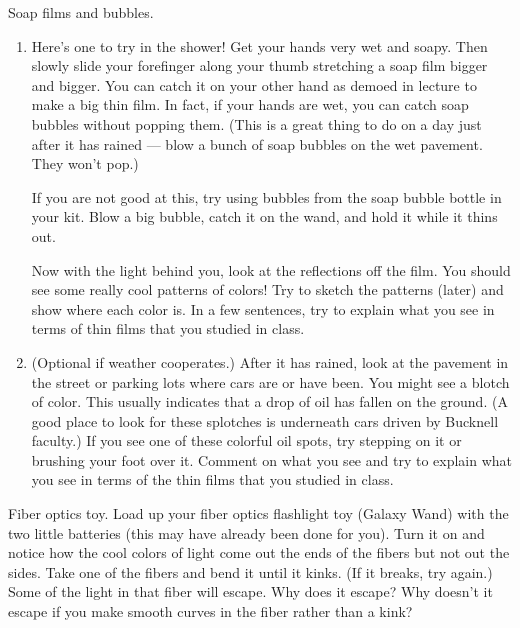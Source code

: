 \newpage

\begin{aproblem}{Soap films and bubbles.} 
  \begin{enumerate} 
  \item Here's one to try in the shower! Get your hands very wet and
    soapy. Then slowly slide your forefinger along your thumb
    stretching a soap film bigger and bigger.  You can catch it on
    your other hand as demoed in lecture to make a big thin film.  In
    fact, if your hands are wet, you can catch soap bubbles without
    popping them. (This is a great thing to do on a day just after it
    has rained --- blow a bunch of soap bubbles on the wet pavement.
    They won't pop.)

    If you are not good at this, try using bubbles from the soap
    bubble bottle in your kit.  Blow a big bubble, catch it on the
    wand, and hold it while it thins out.

    Now with the light behind you, look at the reflections off the
    film. You should see some really cool patterns of colors!  Try to
    sketch the patterns (later) and show where each color is.  In a
    few sentences, try to explain what you see in terms of thin films
    that you studied in class.

  \item (Optional if weather cooperates.)  After it has rained, look
    at the pavement in the street or parking lots where cars are or
    have been.  You might see a blotch of color.  This usually
    indicates that a drop of oil has fallen on the ground.  (A good
    place to look for these splotches is underneath cars driven by
    Bucknell faculty.) If you see one of these colorful oil spots, try
    stepping on it or brushing your foot over it.  Comment on what you
    see and try to explain what you see in terms of the thin films
    that you studied in class.
  \end{enumerate}
\end{aproblem}


\begin{aproblem}{Fiber optics toy.} 
  Load up your fiber optics flashlight toy (Galaxy Wand) with the two
  little batteries (this may have already been done for you). Turn it
  on and notice how the cool colors of light come out the ends of the
  fibers but not out the sides.  Take one of the fibers and bend it
  until it kinks. (If it breaks, try again.)  Some of the light in
  that fiber will escape.  Why does it escape?  Why doesn't it escape
  if you make smooth curves in the fiber rather than a kink?
\end{aproblem}


